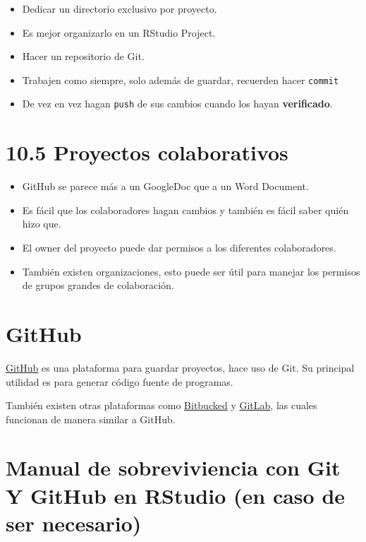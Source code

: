\documentclass[
  spanish,
  12pt,
  letterpaper,
  DIV=11,
  numbers=noendperiod]{scrreprt}
\begin{document}
\begin{itemize}
\item
  Dedicar un directorio exclusivo por proyecto.
\item
  Es mejor organizarlo en un RStudio Project.
\item
  Hacer un repositorio de Git.
\item
  Trabajen como siempre, solo además de guardar, recuerden hacer
  \texttt{commit}
\item
  De vez en vez hagan \texttt{push} de sus cambios cuando los hayan
  \textbf{verificado}.
\end{itemize}

\section{10.5 Proyectos colaborativos}\label{proyectos-colaborativos}

\begin{itemize}
\item
  GitHub se parece más a un GoogleDoc que a un Word Document.
\item
  Es fácil que los colaboradores hagan cambios y también es fácil saber
  quién hizo que.
\item
  El owner del proyecto puede dar permisos a los diferentes
  colaboradores.
\item
  También existen organizaciones, esto puede ser útil para manejar los
  permisos de grupos grandes de colaboración.
\end{itemize}

\section{GitHub}\label{github}

\href{https://github.com/about}{GitHub} es una plataforma para guardar
proyectos, hace uso de Git. Su principal utilidad es para generar código
fuente de programas.

También existen otras plataformas como
\href{https://bitbucket.org/product/}{Bitbucked} y
\href{https://about.gitlab.com/}{GitLab}, las cuales funcionan de manera
similar a GitHub.

\section{Manual de sobreviviencia con Git Y GitHub en RStudio (en caso
de ser
necesario)}\label{manual-de-sobreviviencia-con-git-y-github-en-rstudio-en-caso-de-ser-necesario}
\end{document}

